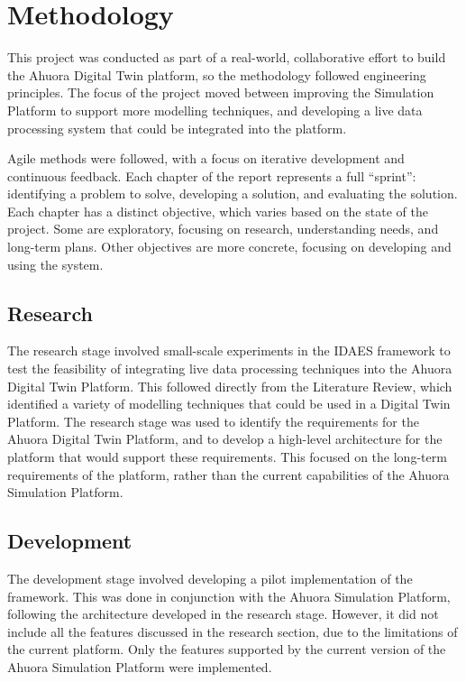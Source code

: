 \chapter{Methodology}

This project was conducted as part of a real-world, collaborative effort to build the Ahuora Digital Twin platform, so the methodology followed engineering principles. The focus of the project moved between improving the Simulation Platform to support more modelling techniques, and developing a live data processing system that could be integrated into the platform.

Agile methods were followed, with a focus on iterative development and continuous feedback. Each chapter of the report represents a full ``sprint'': identifying a problem to solve, developing a solution, and evaluating the solution. Each chapter has a distinct objective, which varies based on the state of the project. Some are exploratory, focusing on research, understanding needs, and long-term plans. Other objectives are more concrete, focusing on developing and using the system. 



\section{Research}

The research stage involved small-scale experiments in the IDAES framework to test the feasibility of integrating live data processing techniques into the Ahuora Digital Twin Platform. This followed directly from the Literature Review, which identified a variety of modelling techniques that could be used in a Digital Twin Platform. The research stage was used to identify the requirements for the Ahuora Digital Twin Platform, and to develop a high-level architecture for the platform that would support these requirements. This focused on the long-term requirements of the platform, rather than the current capabilities of the Ahuora Simulation Platform.

\section{Development}

The development stage involved developing a pilot implementation of the framework. This was done in conjunction with the Ahuora Simulation Platform, following the architecture developed in the research stage. However, it did not include all the features discussed in the research section, due to the limitations of the current platform. Only the features supported by the current version of the Ahuora Simulation Platform were implemented.

